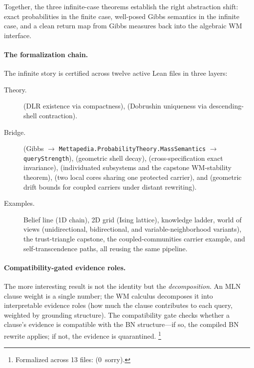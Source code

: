 \documentclass[11pt,openany]{report}
\begin{document}
\noindent
Together, the three infinite-case theorems establish the right abstraction
shift: exact probabilities in the finite case, well-posed Gibbs semantics in
the infinite case, and a clean return map from Gibbs measures back into the
algebraic WM interface.

\paragraph{The formalization chain.}
The infinite story is certified across twelve active Lean files in three
layers:
\begin{description}
\item[Theory.]   (DLR existence
  via compactness),  (Dobrushin
  uniqueness via descending-shell contraction).
\item[Bridge.]   (Gibbs
  $\to$ \texttt{Mettapedia.ProbabilityTheory.MassSemantics} $\to$ \texttt{queryStrength}),
   (geometric shell
  decay),  (cross-specification
  exact invariance),  (individuated
  subsystems and the capstone WM-stability theorem),
   (two local cores sharing one
  protected carrier), and 
  (geometric drift bounds for coupled carriers under distant rewriting).
\item[Examples.]  Belief line (1D chain), 2D grid (Ising lattice),
  knowledge ladder, world of views (unidirectional, bidirectional, and
  variable-neighborhood variants), the trust-triangle capstone, the
  coupled-communities carrier example, and self-transcendence paths, all
  reusing the same pipeline.
\end{description}

\paragraph{Compatibility-gated evidence roles.}
The more interesting result is not the identity but the
\emph{decomposition}.  An MLN clause weight is a single number;
the WM calculus decomposes it into interpretable evidence roles
(how much the clause contributes to each query, weighted by
grounding structure).  The compatibility gate checks whether a
clause's evidence is compatible with the BN structure---if so,
the compiled BN rewrite applies; if not, the evidence is
quarantined.%
\footnote{Formalized across 13 files:
(0~sorry).}
\end{document}
